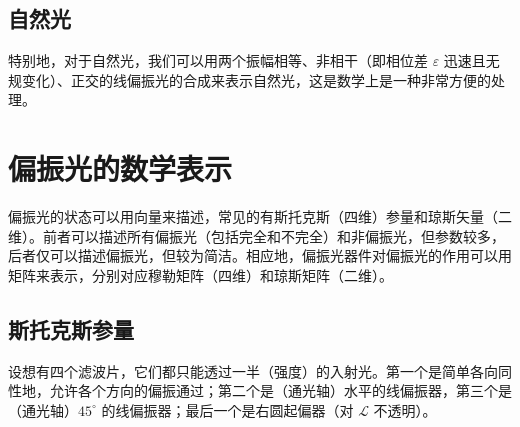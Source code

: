 \documentclass[UTF8]{report}
\theoremstyle{MyLineTheoremStyle} %
\theoremstyle{MyBlockTheoremStyle} %
\theoremstyle{MySubsubsectionStyle} %
\begin{document}
\subsection{自然光}
特别地，对于自然光，我们可以用两个振幅相等、非相干（即相位差 $\varepsilon$ 迅速且无规变化）、正交的线偏振光的合成来表示自然光，这是数学上是一种非常方便的处理。

\section{偏振光的数学表示}

偏振光的状态可以用向量来描述，常见的有斯托克斯（四维）参量和琼斯矢量（二维）。前者可以描述所有偏振光（包括完全和不完全）和非偏振光，但参数较多，后者仅可以描述偏振光，但较为简洁。相应地，偏振光器件对偏振光的作用可以用矩阵来表示，分别对应穆勒矩阵（四维）和琼斯矩阵（二维）。

\subsection{斯托克斯参量}
设想有四个滤波片，它们都只能透过一半（强度）的入射光。第一个是简单各向同性地，允许各个方向的偏振通过；第二个是（通光轴）水平的线偏振器，第三个是（通光轴）$45^\circ$ 的线偏振器；最后一个是右圆起偏器（对 $\mathscr{L}$ 不透明）。
\end{document}
